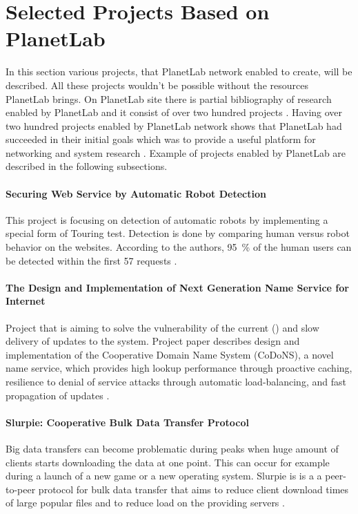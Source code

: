 \section{Selected Projects Based on PlanetLab}
In this section various projects, that PlanetLab network enabled to create, will be described. All these projects wouldn't be possible without the resources PlanetLab brings. On PlanetLab site there is partial bibliography of research enabled by PlanetLab and it consist of over two hundred projects \cite{planetlabmain}. Having over two hundred projects enabled by PlanetLab network shows that PlanetLab had succeeded in their initial goals which was to provide a useful platform for networking and system research \cite{Roscoe_PDN-02-002}. Example of projects enabled by PlanetLab are described in the following subsections.
\paragraph{Securing Web Service by Automatic Robot Detection}
This project is focusing on detection of automatic robots by implementing a special form of Touring test. Detection is done by comparing human versus robot behavior on the websites. According to the authors, \SI{95}{\percent} of the human users can be detected within the first 57 requests \cite{Park:2006:SWS:1267359.1267382}.
\paragraph{The Design and Implementation of Next Generation Name Service for Internet}
Project that is aiming to solve the vulnerability of the current  () and slow delivery of updates to the system. Project paper describes design and implementation of the Cooperative Domain Name System (CoDoNS), a novel name service, which provides high lookup performance through proactive caching, resilience to denial of service attacks through automatic load-balancing, and fast propagation of updates \cite{Ramasubramanian:2004:DIN:1030194.1015504}.
\paragraph{Slurpie: Cooperative Bulk Data Transfer Protocol}
Big data transfers can become problematic during peaks when huge amount of clients starts downloading the data at one point. This can occur for example during a launch of a new game or a new operating system. Slurpie is is a  a peer-to-peer protocol for bulk data transfer that aims to reduce client download times of large popular files and to reduce load on the providing servers \cite{1356981}. 

